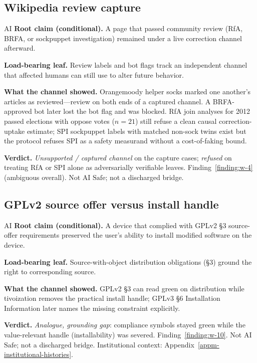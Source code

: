 \subsection{Wikipedia review capture}
\label{sec:appn-reading-w4}
\begin{authbar}{AI}
\textbf{Root claim (conditional).} A page that passed community review (RfA, BRFA, or sockpuppet investigation) remained under a live correction channel afterward.

\textbf{Load-bearing leaf.} Review labels and bot flags track an independent channel that affected humans can still use to alter future behavior.

\textbf{What the channel showed.} Orangemoody helper socks marked one another's articles as reviewed---review on both ends of a captured channel.
A BRFA-approved bot later lost the bot flag and was blocked.
RfA join analyses for 2012 passed elections with oppose votes ($n=21$) still refuse a clean causal correction-uptake estimate; SPI sockpuppet labels with matched non-sock twins exist but the protocol refuses SPI as a safety measurand without a cost-of-faking bound.

\textbf{Verdict.} \emph{Unsupported / captured channel} on the capture cases; \emph{refused} on treating RfA or SPI alone as adversarially verifiable leaves.
Finding~\ref{finding:w-4} (ambiguous overall).
Not AI \(\mathrm{Safe}\); not a discharged bridge.

\end{authbar}
\authbarsubneedspace
\subsection{GPLv2 source offer versus install handle}
\label{sec:appn-reading-w10}
\begin{authbar}{AI}
\textbf{Root claim (conditional).} A device that complied with GPLv2 \S3 source-offer requirements preserved the user's ability to install modified software on the device.

\textbf{Load-bearing leaf.} Source-with-object distribution obligations (\S3) ground the right to corresponding source.

\textbf{What the channel showed.} GPLv2 \S3 can read green on distribution while tivoization removes the practical install handle; GPLv3 \S6 Installation Information later names the missing constraint explicitly.

\textbf{Verdict.} \emph{Analogue, grounding gap}: compliance symbols stayed green while the value-relevant handle (installability) was severed.
Finding~\ref{finding:w-10}.
Not AI \(\mathrm{Safe}\); not a discharged bridge.
Institutional context: Appendix~\ref{appm-institutional-histories}.

\end{authbar}
\authbarsubneedspace
